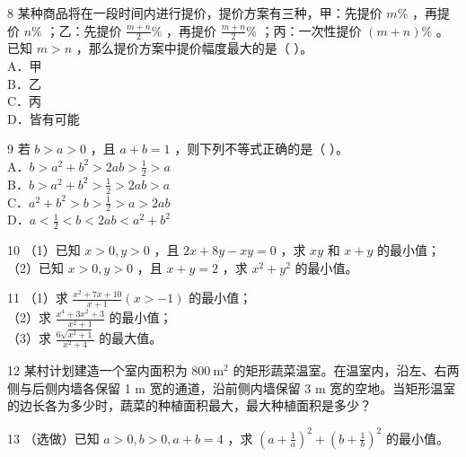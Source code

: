 \documentclass[10pt]{article}
\begin{document}
8 某种商品将在一段时间内进行提价，提价方案有三种，甲：先提价 \(m \%\) ，再提价 \(n \%\) ；乙：先提价 \(\frac{m+n}{2} \%\) ，再提价 \(\frac{m+n}{2} \%\) ；丙：一次性提价 \((m+n) \%\) 。已知 \(m>n\) ，那么提价方案中提价幅度最大的是（ ）。\\
A．甲\\
B．乙\\
C．丙\\
D．皆有可能

9 若 \(b>a>0\) ，且 \(a+b=1\) ，则下列不等式正确的是（ ）。\\
A．\(b>a^{2}+b^{2}>2 a b>\frac{1}{2}>a\)\\
B．\(b>a^{2}+b^{2}>\frac{1}{2}>2 a b>a\)\\
C．\(a^{2}+b^{2}>b>\frac{1}{2}>a>2 a b\)\\
D．\(a<\frac{1}{2}<b<2 a b<a^{2}+b^{2}\)

10 （1）已知 \(x>0, y>0\) ，且 \(2 x+8 y-x y=0\) ，求 \(x y\) 和 \(x+y\) 的最小值；\\
（2）已知 \(x>0, y>0\) ，且 \(x+y=2\) ，求 \(x^{2}+y^{2}\) 的最小值。

11 （1）求 \(\frac{x^{2}+7 x+10}{x+1}(x>-1)\) 的最小值；\\
（2）求 \(\frac{x^{4}+3 x^{2}+3}{x^{2}+1}\) 的最小值；\\
（3）求 \(\frac{6 \sqrt{x^{2}+1}}{x^{2}+4}\) 的最大值。

12 某村计划建造一个室内面积为 \(800 \mathrm{~m}^{2}\) 的矩形蔬菜温室。在温室内，沿左、右两侧与后侧内墙各保留 1 m 宽的通道，沿前侧内墙保留 3 m 宽的空地。当矩形温室的边长各为多少时，蔬菜的种植面积最大，最大种植面积是多少？

13 （选做）已知 \(a>0, b>0, a+b=4\) ，求 \(\left(a+\frac{1}{a}\right)^{2}+\left(b+\frac{1}{b}\right)^{2}\) 的最小值。
\end{document}
